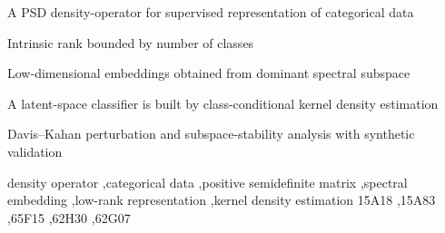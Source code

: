 \documentclass[preprint,11pt]{elsarticle}
\begin{document}
\begin{frontmatter}
\begin{abstract}
    We introduce a supervised dimensionality reduction methodology for categorical (and discretized mixed-type) data based on a density-matrix construction induced by class-conditional frequencies. 
    Given a labeled dataset encoded in a one-hot survey space, we assemble a frequency matrix whose columns aggregate feature occurrences within each class, and define a normalized Gram-type operator that satisfies the axioms of a density matrix. 
    The resulting representation admits an intrinsic rank bound controlled by the number of classes, enabling low-dimensional spectral embeddings via dominant eigenmodes. 
    Classification is performed in the reduced space through class-conditional kernel density estimation and a maximum-likelihood decision rule.
    We establish structural invariances, provide complexity estimates, and validate the approach on synthetic benchmarks probing high cardinality, sparsity, noise, and class imbalance.
\end{abstract}


\begin{highlights}
    \item A PSD density-operator for supervised representation of categorical data %
    \item Intrinsic rank bounded by number of classes %
    \item Low-dimensional embeddings obtained from dominant spectral subspace %
    \item A latent-space classifier is built by class-conditional kernel density estimation %
    \item Davis--Kahan perturbation and subspace-stability analysis with synthetic validation %
\end{highlights}

\begin{keyword}
density operator \sep categorical data \sep positive semidefinite matrix \sep spectral embedding \sep low-rank representation \sep kernel density estimation%
\MSC 15A18 \sep 15A83 \sep 65F15 \sep 62H30 \sep 62G07
\end{keyword}

\end{frontmatter}
\end{document}

